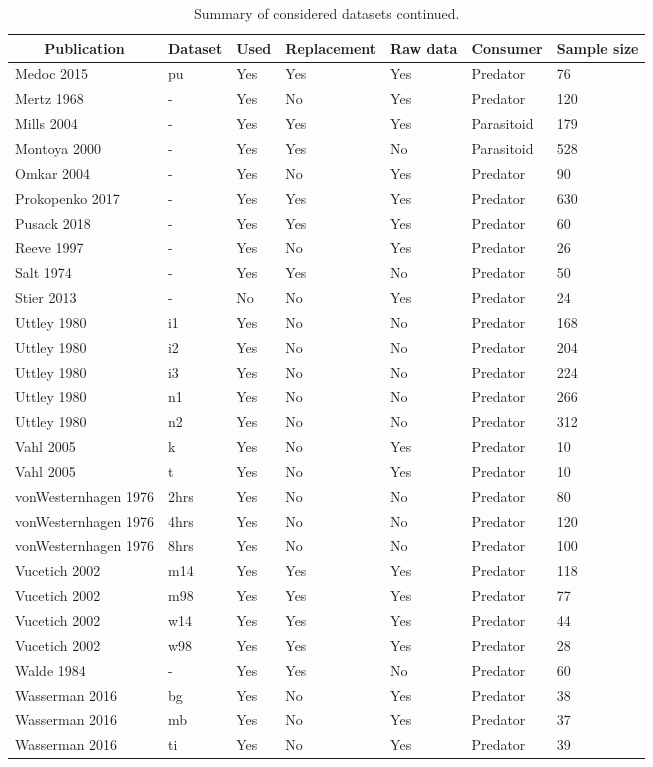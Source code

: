 \begin{table}[!tbp]
\caption{Summary of considered datasets continued.\label{table:datasets}} 
\begin{center}
\begin{tabular}{lllllll}
\hline\hline
\multicolumn{1}{c}{Publication}&\multicolumn{1}{c}{Dataset}&\multicolumn{1}{c}{Used}&\multicolumn{1}{c}{Replacement}&\multicolumn{1}{c}{Raw data}&\multicolumn{1}{c}{Consumer}&\multicolumn{1}{c}{Sample size}\tabularnewline
\hline
Medoc 2015&pu&Yes&Yes&Yes&Predator&76\tabularnewline
Mertz 1968&-&Yes&No&Yes&Predator&120\tabularnewline
Mills 2004&-&Yes&Yes&Yes&Parasitoid&179\tabularnewline
Montoya 2000&-&Yes&Yes&No&Parasitoid&528\tabularnewline
Omkar 2004&-&Yes&No&Yes&Predator&90\tabularnewline
Prokopenko 2017&-&Yes&Yes&Yes&Predator&630\tabularnewline
Pusack 2018&-&Yes&Yes&Yes&Predator&60\tabularnewline
Reeve 1997&-&Yes&No&Yes&Predator&26\tabularnewline
Salt 1974&-&Yes&Yes&No&Predator&50\tabularnewline
Stier 2013&-&No&No&Yes&Predator&24\tabularnewline
Uttley 1980&i1&Yes&No&No&Predator&168\tabularnewline
Uttley 1980&i2&Yes&No&No&Predator&204\tabularnewline
Uttley 1980&i3&Yes&No&No&Predator&224\tabularnewline
Uttley 1980&n1&Yes&No&No&Predator&266\tabularnewline
Uttley 1980&n2&Yes&No&No&Predator&312\tabularnewline
Vahl 2005&k&Yes&No&Yes&Predator&10\tabularnewline
Vahl 2005&t&Yes&No&Yes&Predator&10\tabularnewline
vonWesternhagen 1976&2hrs&Yes&No&No&Predator&80\tabularnewline
vonWesternhagen 1976&4hrs&Yes&No&No&Predator&120\tabularnewline
vonWesternhagen 1976&8hrs&Yes&No&No&Predator&100\tabularnewline
Vucetich 2002&m14&Yes&Yes&Yes&Predator&118\tabularnewline
Vucetich 2002&m98&Yes&Yes&Yes&Predator&77\tabularnewline
Vucetich 2002&w14&Yes&Yes&Yes&Predator&44\tabularnewline
Vucetich 2002&w98&Yes&Yes&Yes&Predator&28\tabularnewline
Walde 1984&-&Yes&Yes&No&Predator&60\tabularnewline
Wasserman 2016&bg&Yes&No&Yes&Predator&38\tabularnewline
Wasserman 2016&mb&Yes&No&Yes&Predator&37\tabularnewline
Wasserman 2016&ti&Yes&No&Yes&Predator&39\tabularnewline
\hline
\end{tabular}\end{center}
\end{table}
